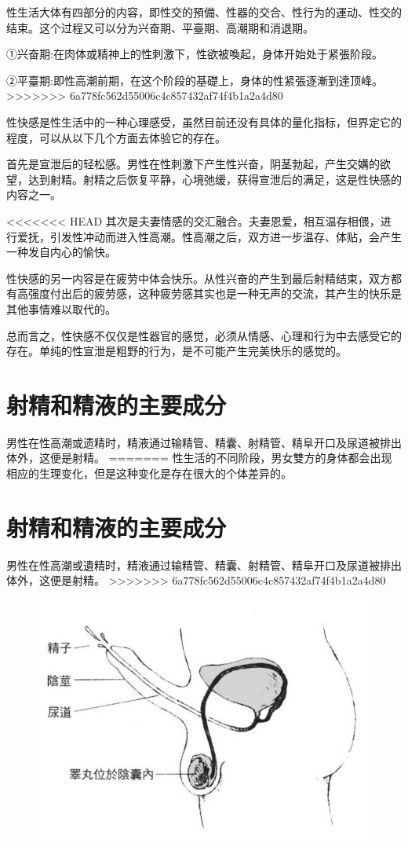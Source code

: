 \documentclass[12pt,UTF8]{ctexbook}
\begin{document}
性生活大体有四部分的内容，即性交的預備、性器的交合、性行为的運动、性交的结束。这个过程又可以分为兴奋期、平臺期、高潮期和消退期。

①兴奋期:在肉体或精神上的性刺激下，性欲被喚起，身体开始处于紧張阶段。

②平臺期:即性高潮前期，在这个阶段的基礎上，身体的性紧張逐漸到達顶峰。
>>>>>>> 6a778fc562d55006c4c857432af74f4b1a2a4d80

性快感是性生活中的一种心理感受，虽然目前还没有具体的量化指标，但界定它的程度，可以从以下几个方面去体验它的存在。

首先是宣泄后的轻松感。男性在性刺激下产生性兴奋，阴茎勃起，产生交媾的欲望，达到射精。射精之后恢复平静，心境弛缓，获得宣泄后的满足，这是性快感的内容之一。

<<<<<<< HEAD
其次是夫妻情感的交汇融合。夫妻恩爱，相互温存相偎，进行爱抚，引发性冲动而进入性高潮。性高潮之后，双方进一步温存、体贴，会产生一种发自内心的愉快。

性快感的另一内容是在疲劳中体会快乐。从性兴奋的产生到最后射精结束，双方都有高强度付出后的疲劳感，这种疲劳感其实也是一种无声的交流，其产生的快乐是其他事情难以取代的。

总而言之，性快感不仅仅是性器官的感觉，必须从情感、心理和行为中去感受它的存在。单纯的性宣泄是粗野的行为，是不可能产生完美快乐的感觉的。

\section{射精和精液的主要成分}

男性在性高潮或遗精时，精液通过输精管、精囊、射精管、精阜开口及尿道被排出体外，这便是射精。
=======
性生活的不同阶段，男女雙方的身体都会出现相应的生理变化，但是这种变化是存在很大的个体差异的。

\section{射精和精液的主要成分}

男性在性高潮或遺精时，精液通过输精管、精囊、射精管、精阜开口及尿道被排出体外，这便是射精。
>>>>>>> 6a778fc562d55006c4c857432af74f4b1a2a4d80

\begin{figure}[htbp]
	\centering
	\includegraphics[width=0.7\linewidth]{5}
	\caption{}
\end{figure}
\end{document}
